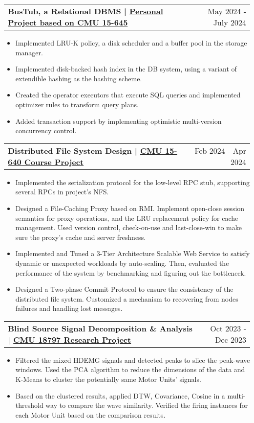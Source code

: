 \documentclass[a4paper,20pt]{article}
\makeatletter
\newcommand{\resumeProjectsSubHeading}[2]{
  \resumeProjectsSubHeadingItem{#1}{#2}
  \vspace{-10pt}
}
\newcommand{\resumeProjectsSubHeadingItem}[2]{
  \vspace{-1pt}
  \item{
    \begin{tabular*} {0.98\textwidth} {@{\hspace{-0.5em}}l@{\extracolsep{\fill}}r}
      \textbf{#1} & {#2} \\
    \end{tabular*}
  \vspace{-8pt}
  }
}
\newcommand{\resumeProjectsItemListStart}{
  \begin{itemize} [leftmargin=*]
}
\newcommand{\resumeProjectsItemListEnd}{
  \end{itemize}
  \vspace{0pt}
}
\newcommand{\resumeProjectsItem}[1]{
  \item{
    {#1} \vspace{-2pt}
  }
}
\makeatother
\begin{document}
\resumeProjectsSubHeading{{BusTub, a Relational DBMS} {| \href{https://github.com/Guo-lab/15645-Database}{Personal Project based on CMU 15-645 \faIcon{github}}}}{May 2024 - July 2024}
\resumeProjectsItemListStart
\resumeProjectsItem{Implemented LRU-K policy, a disk scheduler and a buffer pool in the storage manager.}
\resumeProjectsItem{Implemented disk-backed hash index in the DB system, using a variant of extendible hashing as the hashing scheme.}
\resumeProjectsItem{Created the operator executors that execute SQL queries and implemented optimizer rules to transform query plans.}
\vspace{-12pt}
\resumeProjectsItem{Added transaction support by implementing optimistic multi-version concurrency control.}
\resumeProjectsItemListEnd

\resumeProjectsSubHeading{{Distributed File System Design} {| \href{https://github.com/Guo-lab/15640-Distributed-Systems}{CMU 15-640 Course Project \faIcon{github}}}}{Feb 2024 - Apr 2024}
\resumeProjectsItemListStart
\resumeProjectsItem{Implemented the serialization protocol for the low-level RPC stub, supporting several RPCs in project's NFS.}
\vspace{-1pt}
\resumeProjectsItem{Designed a File-Caching Proxy based on RMI. Implement open-close session semantics for proxy operations, and the LRU replacement policy for cache management. Used version control, check-on-use and last-close-win to make sure the proxy's cache and server freshness.}
\vspace{-1pt}
\resumeProjectsItem{Implemented and Tuned a 3-Tier Architecture Scalable Web Service to satisfy dynamic or unexpected workloads by auto-scaling. Then, evaluated the performance of the system by benchmarking and figuring out the bottleneck.}
\vspace{-1pt}
\resumeProjectsItem{Designed a Two-phase Commit Protocol to ensure the consistency of the distributed file system. Customized a mechanism to recovering from nodes failures and handling lost messages.}
\resumeProjectsItemListEnd

\resumeProjectsSubHeading{Blind Source Signal Decomposition \& Analysis | \href{https://github.com/Guo-lab/MLSP-G2}{CMU 18797 Research Project \faIcon{github}}}{Oct 2023 - Dec 2023}
\resumeProjectsItemListStart
\resumeProjectsItem{Filtered the mixed HDEMG signals and detected peaks to slice the peak-wave windows. Used the PCA algorithm to reduce the dimensions of the data and K-Means to cluster the potentially same Motor Units' signals.}
\vspace{-1pt}
\resumeProjectsItem{Based on the clustered results, applied DTW, Covariance, Cosine in a multi-threshold way to compare the wave similarity. Verified the firing instances for each Motor Unit based on the comparison results.}
\resumeProjectsItemListEnd
\end{document}
